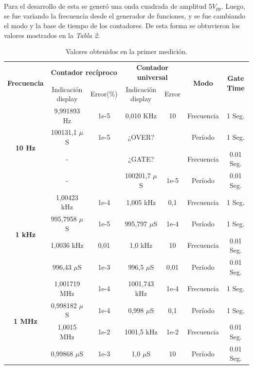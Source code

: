 \documentclass{article}
\begin{document}
	Para el desarrollo de esta se generó una onda cuadrada de amplitud 5$V_{pp}$. Luego, se fue variando la frecuencia desde el generador de funciones, y se fue cambiando el modo y la base de tiempo de los contadores. De esta forma se obtuvieron los valores mostrados en la \textit{Tabla 2}.
\bigskip\bigskip


\begin{table}[!hbt]
	\begin{center}

		\begin{tabular}{|c|c|c|c|c|c|c|} \hline
			\multirow{2}{*}{\textbf{Frecuencia}}
			& \multicolumn{2}{c|}{\textbf{Contador recíproco}} & \multicolumn{2}{c|}{\textbf{Contador universal}} & \multirow{2}{*}{\textbf{Modo}} & \multirow{2}{*}{\textbf{Gate Time}} \\\cline{2-5}
			& Indicación display & Error(\%) & Indicación display & Error & & \\\hline
			
			\multirow{4}{*}{\textbf{10 Hz}}
			& 9,991893 Hz & 1e-5  & 0,010 KHz & 10 & Frecuencia & 1 Seg. \\\cline{2-7}
			& 100131,1 $\mu$S & 1e-5 & ¿OVER? &  & Período & 1 Seg. \\\cline{2-7}
			& - &  & ¿GATE? &  & Frecuencia & 0.01 Seg. \\\cline{2-7}
			& - &  & 100201,7 $\mu$S & 1e-5  & Período & 0.01 Seg. \\\hline

			\multirow{4}{*}{\textbf{1 kHz}}
			& 1,00423 kHz & 1e-4  & 1,005 kHz & 0,1  & Frecuencia & 1 Seg. \\\cline{2-7}
			& 995,7958 $\mu$S & 1e-5 & 995,797 $\mu$S & 1e-4 & Período & 1 Seg. \\\cline{2-7}
			& 1,0036 kHz & 0,01 & 1,0 kHz & 10 & Frecuencia & 0.01 Seg. \\\cline{2-7}
			& 996,43 $\mu$S & 1e-3 & 996,5 $\mu$S & 0,01 & Período & 0.01 Seg. \\\hline

			\multirow{4}{*}{\textbf{1 MHz}}
			& 1,001719 MHz & 1e-4 & 1001,743 kHz & 1e-4 & Frecuencia & 1 Seg. \\\cline{2-7}
			& 0,998182 $\mu$S & 1e-4 & 0,998 $\mu$S & 0,1 & Período & 1 Seg. \\\cline{2-7}
			& 1,0015 MHz & 1e-2 & 1001,5 kHz & 1e-2 & Frecuencia & 0.01 Seg. \\\cline{2-7}
			& 0,99868 $\mu$S & 1e-3 & 1,0 $\mu$S & 10 & Período & 0.01 Seg. \\\hline
		\end{tabular}

	\caption{Valores obtenidos en la primer medición.}
	\end{center}
\end{table}
\medskip\medskip
\end{document}
